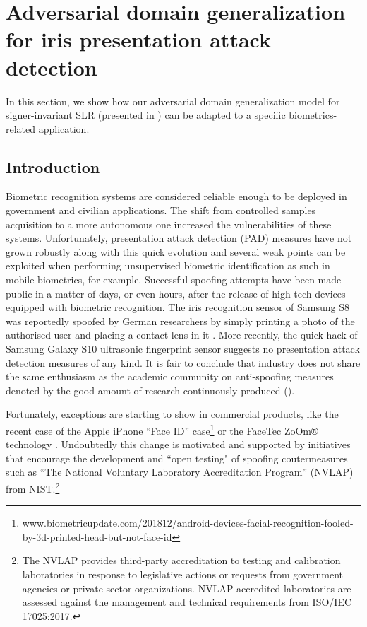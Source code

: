 \section{Adversarial domain generalization for iris presentation attack detection}
\label{sec:adv_iris_attack}
In this section, we show how our adversarial domain generalization model for signer-invariant SLR (presented in ) can be adapted to a specific biometrics-related application.

\subsection{Introduction}
\label{sec:adv_iris_attack_intro}
Biometric recognition systems are considered reliable enough to be deployed in government and civilian applications. The shift from controlled samples acquisition to a more autonomous one increased the vulnerabilities of these systems. Unfortunately, presentation attack detection (PAD) measures have not grown robustly along with this quick evolution and several weak points can be exploited when performing unsupervised biometric identification as such in mobile biometrics, for example. Successful spoofing attempts have been made public in a matter of days, or even hours, after the release of high-tech devices equipped with biometric recognition. The iris recognition sensor of Samsung S8 was reportedly spoofed by German researchers by simply printing a photo of the authorised user and placing a contact lens in it \cite{cccsamsung2017}. More recently, the quick hack of Samsung Galaxy S10 ultrasonic fingerprint sensor suggests no presentation attack detection measures of any kind. It is fair to conclude that industry does not share the same enthusiasm as the academic community on anti-spoofing measures denoted by the good amount of research continuously produced (\citet{raghavendra2015VSIA,czajka2018irisPADreview,Galbally2019,scherhag2019}).

Fortunately, exceptions are starting to show in commercial products, like the recent case of the Apple iPhone ``Face ID'' case\footnote{www.biometricupdate.com/201812/android-devices-facial-recognition-fooled-by-3d-printed-head-but-not-face-id} or the FaceTec ZoOm® technology \cite{facetec102019}. Undoubtedly this change is motivated and supported by initiatives that encourage the development and ``open testing" of spoofing coutermeasures such as ``The National Voluntary Laboratory Accreditation Program'' (NVLAP) from NIST.\footnote{The NVLAP provides third-party accreditation to testing and calibration laboratories in response to legislative actions or requests from government agencies or private-sector organizations. NVLAP-accredited laboratories are assessed against the management and technical requirements from ISO/IEC 17025:2017.}

